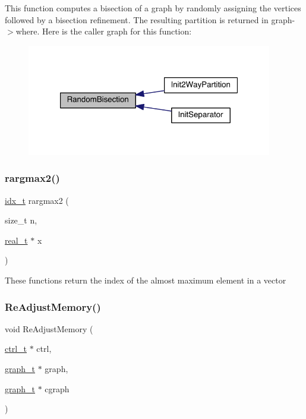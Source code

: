 This function computes a bisection of a graph by randomly assigning the vertices followed by a bisection refinement. The resulting partition is returned in graph-\/$>$where. Here is the caller graph for this function\+:\nopagebreak
\begin{figure}[H]
\begin{center}
\leavevmode
\includegraphics[width=304pt]{a00945_ad9f0573a18d3fcfa45d73c3bef80e5f8_icgraph}
\end{center}
\end{figure}
\mbox{\label{a00945_a053be87cee1fcec555464087ecbf32bc}} 
\subsubsection{\texorpdfstring{rargmax2()}{rargmax2()}}
{\footnotesize\ttfamily \hyperlink{a00876_aaa5262be3e700770163401acb0150f52}{idx\+\_\+t} rargmax2 (\begin{DoxyParamCaption}\item[{size\+\_\+t}]{n,  }\item[{\hyperlink{a00876_a1924a4f6907cc3833213aba1f07fcbe9}{real\+\_\+t} $\ast$}]{x }\end{DoxyParamCaption})}

These functions return the index of the almost maximum element in a vector \mbox{\label{a00945_ab69ab96ec78174da232dff05e9c79d2f}} 
\subsubsection{\texorpdfstring{Re\+Adjust\+Memory()}{ReAdjustMemory()}}
{\footnotesize\ttfamily void Re\+Adjust\+Memory (\begin{DoxyParamCaption}\item[{\hyperlink{a00742}{ctrl\+\_\+t} $\ast$}]{ctrl,  }\item[{\hyperlink{a00734}{graph\+\_\+t} $\ast$}]{graph,  }\item[{\hyperlink{a00734}{graph\+\_\+t} $\ast$}]{cgraph }\end{DoxyParamCaption})}


